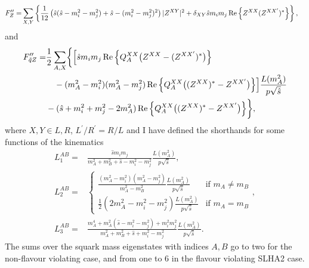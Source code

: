 \documentclass[../main.tex]{subfiles}
\begin{document}
\begin{align}
  \label{part:eq:eff_coupling_FZ}
  F^{\prime\prime}_{Z} = & \sum_{X,Y} \cclosed{\frac{1}{12} \pclosed{\hat{s}(\hat{s}-m_i^2-m_j^2) + \hat{s} - (m_i^2-m_j^2)^2} |Z^{XY}|^2 + \delta_{XY} \hat{s}m_i m_j \Re{Z^{XX} (Z^{XX^\prime})^\ast}},
\end{align}
and
\begin{align}
  \label{part:eq:eff_coupling_FqZ}
  \nonumber
  F^{\prime\prime}_{\tilde{q}Z} = & \frac{1}{2} \sum_{A, X} \biggl\{
  \Bigl[\hat{s} m_i m_j \Re{Q_A^{XX} \bigl(Z^{XX} - (Z^{XX^\prime})^\ast\bigr)}                                                                                       \\
  \nonumber
                                  & \quad - (m_A^2-m_i^2)(m_A^2-m_j^2) \Re{Q_A^{XX}\bigl((Z^{XX})^\ast - Z^{XX^\prime}\bigr)}\Bigr] \frac{L(m_A^2)}{p \sqrt{\hat{s}}} \\
                                  & - (\hat{s} + m_i^2 + m_j^2 - 2m_A^2) \Re{Q_A^{XX}\bigl((Z^{XX})^\ast - Z^{XX^\prime}\bigr)}
  \biggr\},
\end{align}
where \(X,Y \in L,R\), \(L^\prime/R^\prime = R/L\) and I have defined the shorthands for some functions of the kinematics
\begin{subequations}
  \begin{align}
    L_1^{AB} = & \frac{\hat{s}m_i m_j}{m_A^2+m_B^2 + \hat{s} - m_i^2 - m_j^2} \frac{L(m_A^2)}{p \sqrt{\hat{s}}},                                                                                                                                                         \\
    L_2^{AB} = & \begin{cases}\frac{(m_A^2-m_i^2)(m_A^2-m_j^2)}{m_A^2-m_B^2} \frac{L(m_A^2)}{p \sqrt{\hat{s}}} & \text{if } m_A \neq m_B \\ \frac{1}{2}(2 m_A^2 - m_i^2 - m_j^2) \frac{L(m_A^2)}{p \sqrt{\hat{s}}} & \text{if } m_A = m_B \end{cases}, \\
    L_3^{AB} = & \frac{m_A^4 + m_A^2(\hat{s}-m_i^2-m_j^2) + m_i^2 m_j^2}{m_A^2+m_B^2 + \hat{s} + m_i^2 - m_j^2} \frac{L(m_A^2)}{p \sqrt{\hat{s}}}.
  \end{align}
\end{subequations}
The sums over the squark mass eigenstates with indices \(A, B\) go to two for the non-flavour violating case, and from one to 6 in the flavour violating SLHA2 case.
\end{document}
